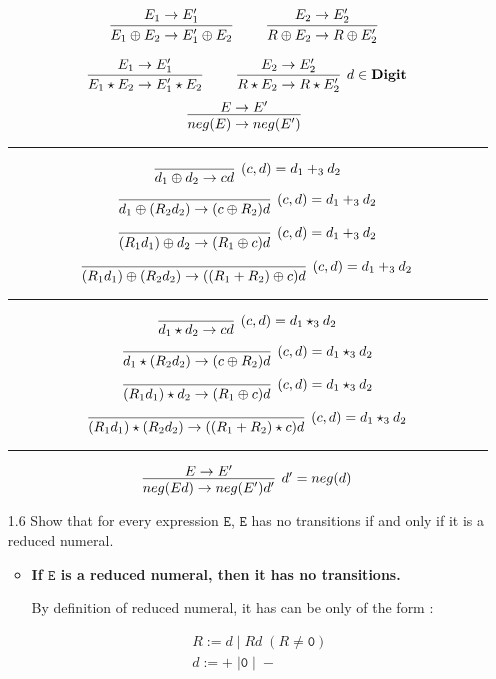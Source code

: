 \documentclass[a4paper,10pt]{article}
\newcommand{\E}{\mathtt{E}}
\newcommand{\Digit}{\mathbf{Digit}}
\newcommand{\question}[1]
{\color{DarkBlue}#1 \color{Black} \newline}
\begin{document}
\begin{enumerate}
\[
\infer[]
  {E_{1} \oplus E_{2} \rightarrow E_{1}' \oplus E_{2}}
  {E_{1} \rightarrow E_{1}'} 
\qquad
\infer[]
  {R \oplus E_{2} \rightarrow R \oplus E_{2}'}
  {E_{2} \rightarrow E_{2}'}
\]

\[
\infer[]
  {E_{1} \star E_{2} \rightarrow E_{1}' \star E_{2}}
  {E_{1} \rightarrow E_{1}'} 
\qquad
\infer[d \in \Digit]
  {R \star E_{2} \rightarrow R \star E_{2}'}
  {E_{2} \rightarrow E_{2}'}
\]
\[
\infer[]
  {neg(E) \rightarrow neg(E')}
  {E \rightarrow E'}
\]

\hrule

\[
\infer[(c, d) = d_{1} +_3 d_{2}] 
  {d_{1} \oplus d_{2} \rightarrow cd}
  {}  
\]
\[
\infer[(c, d) = d_{1} +_3 d_{2}] 
  {d_{1} \oplus (R_{2} d_{2}) \rightarrow (c \oplus R_{2}) d}
  {}  
\]
\[
\infer[(c, d) = d_{1} +_3 d_{2}] 
  {(R_{1} d_{1}) \oplus d_{2}  \rightarrow (R_{1} \oplus c) d}
  {}  
\]
\[
\infer[(c, d) = d_{1} +_3 d_{2}] 
  {(R_{1} d_{1}) \oplus (R_{2} d_{2}) \rightarrow ((R_{1} + R_{2}) \oplus c) d}
  {}  
\]

\hrule

\[
\infer[(c, d) = d_{1} \star_{3} d_{2}] 
  {d_{1} \star d_{2} \rightarrow cd}
  {}  
\]
\[
\infer[(c, d) = d_{1} \star_{3} d_{2}] 
  {d_{1} \star (R_{2} d_{2}) \rightarrow (c \oplus R_{2}) d}
  {}  
\]
\[
\infer[(c, d) = d_{1} \star_{3} d_{2}] 
  {(R_{1} d_{1}) \star d_{2}  \rightarrow (R_{1} \oplus c) d}
  {}  
\]
\[
\infer[(c, d) = d_{1} \star_{3} d_{2}] 
  {(R_{1} d_{1}) \star (R_{2} d_{2}) \rightarrow ((R_{1} + R_{2}) \star c) d}
  {}  
\]

\hrule

\[
\infer[d' = neg(d)] 
  {neg(Ed) \rightarrow neg(E')d'}  
  {E \rightarrow E'}    
\]

\question{
\item[1.6] Show that for every expression $\E$, $\E$ has no transitions if and 
only if it is a reduced numeral.
}

\begin{itemize}

	\item {\textbf{If $\E$ is a reduced numeral, then it has no transitions.}}
	
	By definition of reduced numeral, it has can be only of the form :
	
\begin{gather*}
R := d \; | \; Rd \; (R \neq \mathtt{0}) \\
d := + \; | \mathtt{0} \; | \; - 
\end{gather*}
	

\end{itemize}
\end{enumerate}
\end{document}
